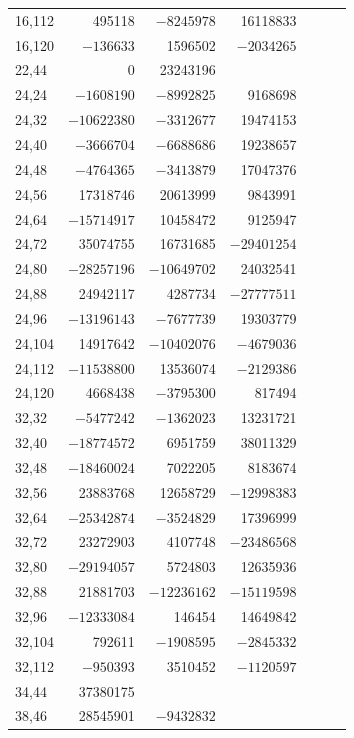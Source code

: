\documentclass[11pt,colorlinks]{charlie}
\begin{document}
{\begin{longtable}{@{}l rrrrrr@{}}
16,112 & 495118 & $-8245978$ & 16118833 &  &  & \\
16,120 & $-136633$ & 1596502 & $-2034265$ &  &  & \\
22,44 & 0 & 23243196 &  &  &  & \\
24,24 & $-1608190$ & $-8992825$ & 9168698 &  &  & \\
24,32 & $-10622380$ & $-3312677$ & 19474153 &  &  & \\
24,40 & $-3666704$ & $-6688686$ & 19238657 &  &  & \\
24,48 & $-4764365$ & $-3413879$ & 17047376 &  &  & \\
24,56 & 17318746 & 20613999 & 9843991 &  &  & \\
24,64 & $-15714917$ & 10458472 & 9125947 &  &  & \\
24,72 & 35074755 & 16731685 & $-29401254$ &  &  & \\
24,80 & $-28257196$ & $-10649702$ & 24032541 &  &  & \\
24,88 & 24942117 & 4287734 & $-27777511$ &  &  & \\
24,96 & $-13196143$ & $-7677739$ & 19303779 &  &  & \\
24,104 & 14917642 & $-10402076$ & $-4679036$ &  &  & \\
24,112 & $-11538800$ & 13536074 & $-2129386$ &  &  & \\
24,120 & 4668438 & $-3795300$ & 817494 &  &  & \\
32,32 & $-5477242$ & $-1362023$ & 13231721 &  &  & \\
32,40 & $-18774572$ & 6951759 & 38011329 &  &  & \\
32,48 & $-18460024$ & 7022205 & 8183674 &  &  & \\
32,56 & 23883768 & 12658729 & $-12998383$ &  &  & \\
32,64 & $-25342874$ & $-3524829$ & 17396999 &  &  & \\
32,72 & 23272903 & 4107748 & $-23486568$ &  &  & \\
32,80 & $-29194057$ & 5724803 & 12635936 &  &  & \\
32,88 & 21881703 & $-12236162$ & $-15119598$ &  &  & \\
32,96 & $-12333084$ & 146454 & 14649842 &  &  & \\
32,104 & 792611 & $-1908595$ & $-2845332$ &  &  & \\
32,112 & $-950393$ & 3510452 & $-1120597$ &  &  & \\
34,44 & 37380175 &  &  &  &  & \\
38,46 & 28545901 & $-9432832$ &  &  &  & \\

\end{longtable}}
\end{document}
